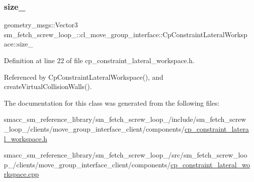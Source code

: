 \mbox{\label{classsm__fetch__screw__loop__1_1_1cl__move__group__interface_1_1CpConstraintLateralWorkspace_a366a13dee9298d95900d1b905feb9216}} 
\subsubsection{\texorpdfstring{size\+\_\+}{size\_}}
{\footnotesize\ttfamily geometry\+\_\+msgs\+::\+Vector3 sm\+\_\+fetch\+\_\+screw\+\_\+loop\+\_\+::cl\+\_\+move\+\_\+group\+\_\+interface\+::\+Cp\+Constraint\+Lateral\+Workspace\+::size\+\_\+\hspace{0.3cm}{\ttfamily [private]}}



Definition at line 22 of file cp\+\_\+constraint\+\_\+lateral\+\_\+workspace.\+h.



Referenced by Cp\+Constraint\+Lateral\+Workspace(), and create\+Virtual\+Collision\+Walls().



The documentation for this class was generated from the following files\+:\begin{DoxyCompactItemize}
\item 
smacc\+\_\+sm\+\_\+reference\+\_\+library/sm\+\_\+fetch\+\_\+screw\+\_\+loop\+\_/include/sm\+\_\+fetch\+\_\+screw\+\_\+loop\+\_/clients/move\+\_\+group\+\_\+interface\+\_\+client/components/\hyperlink{sm__fetch__screw__loop__1_2include_2sm__fetch__screw__loop__1_2clients_2move__group__interface__10670b3f477adb943b391e634ec8d801}{cp\+\_\+constraint\+\_\+lateral\+\_\+workspace.\+h}\item 
smacc\+\_\+sm\+\_\+reference\+\_\+library/sm\+\_\+fetch\+\_\+screw\+\_\+loop\+\_/src/sm\+\_\+fetch\+\_\+screw\+\_\+loop\+\_/clients/move\+\_\+group\+\_\+interface\+\_\+client/components/\hyperlink{sm__fetch__screw__loop__1_2src_2sm__fetch__screw__loop__1_2clients_2move__group__interface__clieb2113844d572b8f574ad1d1a7cee9cc1}{cp\+\_\+constraint\+\_\+lateral\+\_\+workspace.\+cpp}\end{DoxyCompactItemize}
